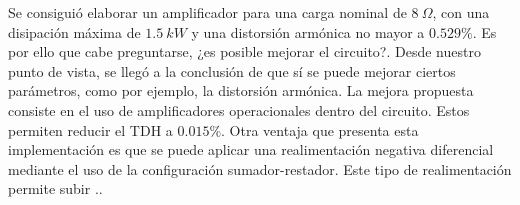 

	

Se consiguió elaborar un amplificador para una carga nominal de $8 \ \Omega$, con una disipación máxima de $1.5 \ kW$ y una distorsión armónica no mayor a $0.529\%$. Es por ello que cabe preguntarse, ¿es posible mejorar el circuito?. Desde nuestro punto de vista, se llegó a la conclusión de que sí se puede mejorar ciertos parámetros, como por ejemplo, la distorsión armónica. La mejora propuesta consiste en el uso de amplificadores operacionales dentro del circuito. Estos permiten reducir el TDH a $0.015 \%$. Otra ventaja que presenta esta implementación es que se puede aplicar una realimentación negativa diferencial mediante el uso de la configuración sumador-restador. Este tipo de realimentación permite subir ..
	
